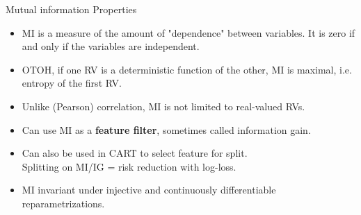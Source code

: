 \documentclass[11pt,compress,t,notes=noshow, xcolor=table]{beamer}
\begin{document}
\begin{vbframe} {Mutual information Properties}


\begin{itemize}
  \item MI is a measure of the amount of "dependence" between variables. It is zero if and only if the variables are independent.
  \item OTOH, if one RV is a deterministic function of the other, MI is maximal, i.e. entropy of the first RV.
 \item Unlike (Pearson) correlation, MI is not limited to real-valued RVs.
    \item Can use MI as a \textbf{feature filter},
    sometimes called information gain.
  \item Can also be used in CART to select feature for split.\\ Splitting on MI/IG = risk reduction with log-loss.
  \item MI invariant under injective and continuously differentiable reparametrizations.
\end{itemize}
\end{vbframe}
\end{document}
